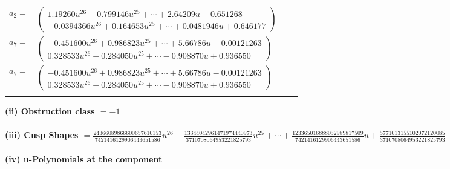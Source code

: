 \documentclass[1p]{elsarticle_modified}
\theoremstyle{definition}
\begin{document}
\begin{tabular}{m{7pt} m{180pt} m{7pt} m{180pt} }
\flushright $a_{2}=$&$\begin{pmatrix}1.19260 u^{26}-0.799146 u^{25}+\cdots+2.64209 u-0.651268\\-0.0394366 u^{26}+0.164653 u^{25}+\cdots+0.0481946 u+0.646177\end{pmatrix}$ \\
\flushright $a_{7}=$&$\begin{pmatrix}-0.451600 u^{26}+0.986823 u^{25}+\cdots+5.66786 u-0.00121263\\0.328533 u^{26}-0.284050 u^{25}+\cdots-0.908870 u+0.936550\end{pmatrix}$\\ \flushright $a_{7}=$&$\begin{pmatrix}-0.451600 u^{26}+0.986823 u^{25}+\cdots+5.66786 u-0.00121263\\0.328533 u^{26}-0.284050 u^{25}+\cdots-0.908870 u+0.936550\end{pmatrix}$\\&\end{tabular}
\flushleft \textbf{(ii) Obstruction class $= -1$}\\~\\
\flushleft \textbf{(iii) Cusp Shapes $= \frac{24366089866600657610153}{7421416129906443651586} u^{26}-\frac{13344042961471974440973}{3710708064953221825793} u^{25}+\cdots+\frac{123365016888052989817509}{7421416129906443651586} u+\frac{5771013155102072120085}{3710708064953221825793}$}\\~\\
\newpage\renewcommand{\arraystretch}{1}
\flushleft \textbf{(iv) u-Polynomials at the component}\newline \\
\end{document}
